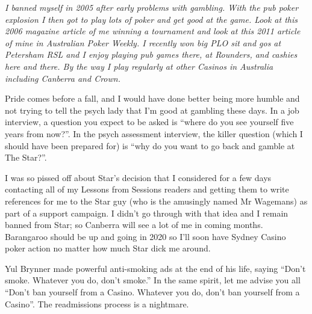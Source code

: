 \textit{I banned myself in 2005 after early problems with gambling.
With the pub poker explosion I then got to play lots of poker and
get good at the game. Look at this 2006 magazine article of me winning
a tournament and look at this 2011 article of mine in Australian Poker
Weekly. I recently won big PLO sit and gos at Petersham RSL and I
enjoy playing pub games there, at Rounders, and cashies here and
there. By the way I play regularly at other Casinos in Australia
including Canberra and Crown.}

Pride comes before a fall, and I would have done better being more
humble and not trying to tell the psych lady that I'm good at gambling
these days. In a job interview, a question you expect to be
asked is ``where do you see yourself five years from now?''. In the
psych assessment interview, the killer question (which I should have
been prepared for) is ``why do you want to go back and gamble at The
Star?''.

I was so pissed off about Star's decision that I considered for a few
days contacting all of my Lessons from Sessions readers and getting
them to write references for me to the Star guy (who is the amusingly
named Mr Wagemans) as part of a support campaign. I didn't go through
with that idea and I remain banned from Star; so Canberra will see a
lot of me in coming months. Barangaroo should be up and going in
2020 so I'll soon have Sydney Casino poker action no matter how much
Star dick me around.

Yul Brynner made powerful anti-smoking ads at the end of his life, saying
``Don't smoke. Whatever you do, don't smoke.'' In the same spirit, let
me advise you all ``Don't ban yourself from a Casino. Whatever you
do, don't ban yourself from a Casino''. The readmissions process is a
nightmare.







